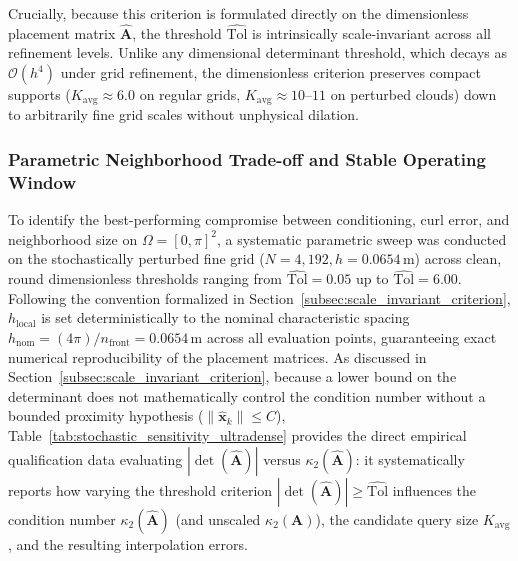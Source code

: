 \documentclass[preprint,12pt]{elsarticle}
\begin{document}
Crucially, because this criterion is formulated directly on the dimensionless placement matrix $\widehat{\mathbf{A}}$, the threshold $\widehat{\mathrm{Tol}}$ is intrinsically scale-invariant across all refinement levels. Unlike any dimensional determinant threshold, which decays as $\mathcal{O}(h^4)$ under grid refinement, the dimensionless criterion preserves compact supports ($K_{\mathrm{avg}} \approx 6.0$ on regular grids, $K_{\mathrm{avg}} \approx 10\text{--}11$ on perturbed clouds) down to arbitrarily fine grid scales without unphysical dilation.

\subsubsection{Parametric Neighborhood Trade-off and Stable Operating Window}
\label{subsubsec:parametric_tradeoff}

To identify the best-performing compromise between conditioning, curl error, and neighborhood size on $\Omega = [0, \pi]^2$, a systematic parametric sweep was conducted on the stochastically perturbed fine grid ($N = 4{,}192, h = 0.0654$\,m) across clean, round dimensionless thresholds ranging from $\widehat{\mathrm{Tol}} = 0.05$ up to $\widehat{\mathrm{Tol}} = 6.00$. Following the convention formalized in Section~\ref{subsec:scale_invariant_criterion}, $h_{\mathrm{local}}$ is set deterministically to the nominal characteristic spacing $h_{\mathrm{nom}} = (4\pi)/n_{\mathrm{front}} = 0.0654$\,m across all evaluation points, guaranteeing exact numerical reproducibility of the placement matrices. As discussed in Section~\ref{subsec:scale_invariant_criterion}, because a lower bound on the determinant does not mathematically control the condition number without a bounded proximity hypothesis ($\|\hat{\mathbf{x}}_k\| \le C$), Table~\ref{tab:stochastic_sensitivity_ultradense} provides the direct empirical qualification data evaluating $|\det(\widehat{\mathbf{A}})|$ versus $\kappa_2(\widehat{\mathbf{A}})$: it systematically reports how varying the threshold criterion $|\det(\widehat{\mathbf{A}})| \ge \widehat{\mathrm{Tol}}$ influences the condition number $\kappa_2(\widehat{\mathbf{A}})$ (and unscaled $\kappa_2(\mathbf{A})$), the candidate query size $K_{\mathrm{avg}}$, and the resulting interpolation errors.
\end{document}
